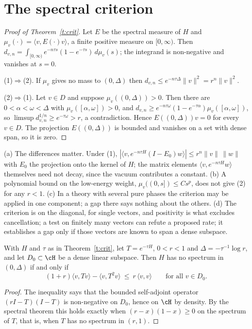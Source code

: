 \section{The spectral criterion}\label{s:crit}
\begin{proof}[Proof of Theorem~\ref{t:crit}]
Let $E$ be the spectral measure of $H$ and $\mu_v(\cdot)=\langle v,E(\cdot)v\rangle$, a finite positive measure
on $[0,\infty)$. Then $d_{v,n}=\int_{[0,\infty)}e^{-n\tau s}(1-e^{-\tau s})\,d\mu_v(s)$; the integrand is
non-negative and vanishes at $s=0$.

(1)$\Rightarrow$(2). If $\mu_v$ gives no mass to $(0,\Delta)$ then $d_{v,n}\le e^{-n\tau\Delta}\|v\|^2=r^n\|v\|^2$.

(2)$\Rightarrow$(1). Let $v\in D$ and suppose $\mu_v((0,\Delta))>0$. Then there are $0<\alpha<\omega<\Delta$ with
$\mu_v([\alpha,\omega])>0$, and $d_{v,n}\ge e^{-n\tau\omega}(1-e^{-\tau\alpha})\mu_v([\alpha,\omega])$, so
$\limsup d_{v,n}^{1/n}\ge e^{-\tau\omega}>r$, a contradiction. Hence $E((0,\Delta))v=0$ for every $v\in D$.
The projection $E((0,\Delta))$ is bounded and vanishes on a set with dense span, so it is zero.
\end{proof}

\begin{remark}\label{r:crit}
(a) The differences matter. Under (1), $|\langle v,e^{-n\tau H}(I-E_0)w\rangle|\le r^n\|v\|\,\|w\|$ with $E_0$ the
projection onto the kernel of $H$; the matrix elements $\langle v,e^{-n\tau H}w\rangle$ themselves need not decay,
since the vacuum contributes a constant. (b) A polynomial bound on the low-energy weight,
$\mu_v((0,s])\le Cs^p$, does not give (2) for any $r<1$. (c) In a theory with several pure phases the criterion
may be applied in one component; a gap there says nothing about the others. (d) The criterion is on the
diagonal, for single vectors, and positivity is what excludes cancellation; a test on finitely many vectors
can refute a proposed rate; it establishes a gap only if those vectors are known to span a dense subspace.
\end{remark}

\begin{proposition}\label{p:three}
With $H$ and $\tau$ as in Theorem~\ref{t:crit}, let $T=e^{-\tau H}$, $0<r<1$ and $\Delta=-\tau^{-1}\log r$, and let
$D_0\subset\cH$ be a dense linear subspace. Then $H$ has no spectrum in $(0,\Delta)$ if and only if
\[
(1+r)\langle v,Tv\rangle-\langle v,T^2v\rangle\ \le\ r\,\langle v,v\rangle\qquad\text{for all }v\in D_0 .
\]
\end{proposition}
\begin{proof}
The inequality says that the bounded self-adjoint operator $(rI-T)(I-T)$ is non-negative on $D_0$, hence on
$\cH$ by density. By the spectral theorem this holds exactly when $(r-x)(1-x)\ge0$ on the spectrum of $T$,
that is, when $T$ has no spectrum in $(r,1)$.
\end{proof}

